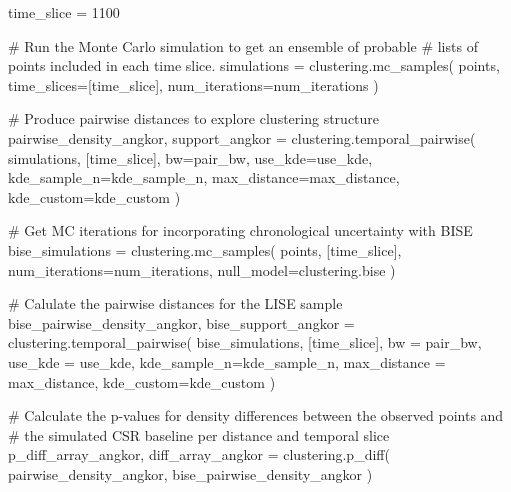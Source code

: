 \documentclass[
  11pt,
  letterpaper,
  DIV=11,
  numbers=noendperiod]{scrartcl}
\newenvironment{Shaded}{\begin{snugshade}}{\end{snugshade}}
\newcommand{\CommentTok}[1]{\textcolor[rgb]{0.37,0.37,0.37}{#1}}
\newcommand{\DecValTok}[1]{\textcolor[rgb]{0.68,0.00,0.00}{#1}}
\newcommand{\NormalTok}[1]{\textcolor[rgb]{0.00,0.23,0.31}{#1}}
\newcommand{\OperatorTok}[1]{\textcolor[rgb]{0.37,0.37,0.37}{#1}}
\begin{document}
\begin{Shaded}
\begin{Highlighting}[]
\NormalTok{time\_slice }\OperatorTok{=} \DecValTok{1100}

\CommentTok{\# Run the Monte Carlo simulation to get an ensemble of probable }
\CommentTok{\# lists of points included in each time slice.}
\NormalTok{simulations }\OperatorTok{=}\NormalTok{ clustering.mc\_samples(}
\NormalTok{    points, }
\NormalTok{    time\_slices}\OperatorTok{=}\NormalTok{[time\_slice],  }
\NormalTok{    num\_iterations}\OperatorTok{=}\NormalTok{num\_iterations}
\NormalTok{)}

\CommentTok{\# Produce pairwise distances to explore clustering structure}
\NormalTok{pairwise\_density\_angkor, support\_angkor }\OperatorTok{=}\NormalTok{ clustering.temporal\_pairwise(}
\NormalTok{    simulations, }
\NormalTok{    [time\_slice],}
\NormalTok{    bw}\OperatorTok{=}\NormalTok{pair\_bw, }
\NormalTok{    use\_kde}\OperatorTok{=}\NormalTok{use\_kde, }
\NormalTok{    kde\_sample\_n}\OperatorTok{=}\NormalTok{kde\_sample\_n,}
\NormalTok{    max\_distance}\OperatorTok{=}\NormalTok{max\_distance,}
\NormalTok{    kde\_custom}\OperatorTok{=}\NormalTok{kde\_custom}
\NormalTok{)}

\CommentTok{\# Get MC iterations for incorporating chronological uncertainty with BISE}
\NormalTok{bise\_simulations }\OperatorTok{=}\NormalTok{ clustering.mc\_samples(}
\NormalTok{    points, }
\NormalTok{    [time\_slice], }
\NormalTok{    num\_iterations}\OperatorTok{=}\NormalTok{num\_iterations,}
\NormalTok{    null\_model}\OperatorTok{=}\NormalTok{clustering.bise}
\NormalTok{)}

\CommentTok{\# Calulate the pairwise distances for the LISE sample}
\NormalTok{bise\_pairwise\_density\_angkor, bise\_support\_angkor }\OperatorTok{=}\NormalTok{ clustering.temporal\_pairwise(}
\NormalTok{    bise\_simulations, }
\NormalTok{    [time\_slice], }
\NormalTok{    bw }\OperatorTok{=}\NormalTok{ pair\_bw, }
\NormalTok{    use\_kde }\OperatorTok{=}\NormalTok{ use\_kde,}
\NormalTok{    kde\_sample\_n}\OperatorTok{=}\NormalTok{kde\_sample\_n, }
\NormalTok{    max\_distance }\OperatorTok{=}\NormalTok{ max\_distance,}
\NormalTok{    kde\_custom}\OperatorTok{=}\NormalTok{kde\_custom}
\NormalTok{)}

\CommentTok{\# Calculate the p{-}values for density differences between the observed points and }
\CommentTok{\# the simulated CSR baseline per distance and temporal slice}
\NormalTok{p\_diff\_array\_angkor, diff\_array\_angkor }\OperatorTok{=}\NormalTok{ clustering.p\_diff(}
\NormalTok{    pairwise\_density\_angkor, }
\NormalTok{    bise\_pairwise\_density\_angkor}
\NormalTok{)}
\end{Highlighting}
\end{Shaded}
\end{document}
